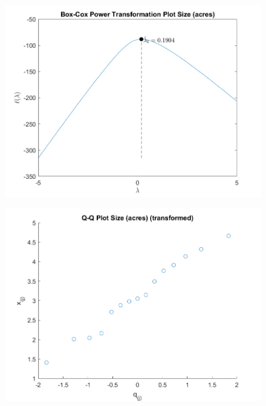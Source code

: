 \begin{enumerate}[label= (\alph*)]
    \begin{center}
        \begin{figure}[H]
            \centering
            \includegraphics[scale=0.4]{./matlab/chapter-4/sol4.40.power.1.png}
        \end{figure}
    \end{center}
    
    \begin{center}
        \begin{figure}[H]
            \centering
            \includegraphics[scale=0.4]{./matlab/chapter-4/sol4.40.qq.tr.1.png}
        \end{figure}
    \end{center}



\end{enumerate}

